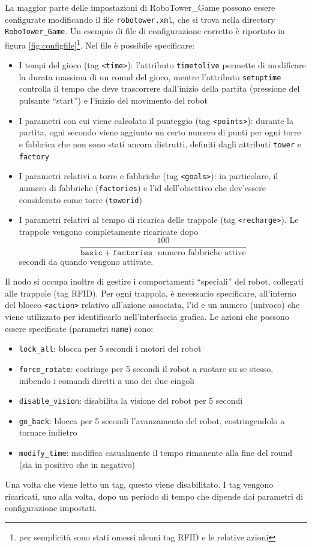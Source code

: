La maggior parte delle impostazioni di RoboTower\_Game possono essere configurate modificando il file \verb|robotower.xml|, che si trova nella directory \verb|RoboTower_Game|. Un esempio di file di configurazione corretto è riportato in figura \ref{fig:configfile}\footnote{per semplicità sono stati omessi alcuni tag RFID e le relative azioni}. Nel file è possibile specificare:
\begin{itemize}
\item I tempi del gioco (tag \lstinline|<time>|): l'attributo \lstinline|timetolive| permette di modificare la durata massima di un round del gioco, mentre l'attributo \lstinline|setuptime| controlla il tempo che deve trascorrere dall'inizio della partita (pressione del pulsante ``start'') e l'inizio del movimento del robot
\item I parametri con cui viene calcolato il punteggio (tag \lstinline|<points>|): durante la partita, ogni secondo viene aggiunto un certo numero di punti per ogni torre e fabbrica che non sono stati ancora distrutti, definiti dagli attributi \lstinline|tower| e \lstinline|factory|
\item I parametri relativi a torre e fabbriche (tag \lstinline|<goals>|): in particolare, il numero di fabbriche (\lstinline|factories|) e l'id dell'obiettivo che dev'essere considerato come torre (\lstinline|towerid|)
\item I parametri relativi al tempo di ricarica delle trappole (tag \lstinline|<recharge>|). Le trappole vengono completamente ricaricate dopo
\[\frac{100}{\texttt{basic} + \texttt{factories} \cdot \textrm{numero fabbriche attive}}\]
secondi da quando vengono attivate.
\end{itemize}
Il nodo si occupa inoltre di gestire i comportamenti ``speciali'' del robot, collegati alle trappole (tag RFID). Per ogni trappola, è necessario specificare, all'interno del blocco \lstinline|<action>| relativo all'azione associata, l'id e un numero (univoco) che viene utilizzato per identificarlo nell'interfaccia grafica. Le azioni che possono essere specificate (parametri \lstinline|name|) sono:
\begin{itemize}
\item \lstinline|lock_all|: blocca per 5 secondi i motori del robot
\item \lstinline|force_rotate|: costringe per 5 secondi il robot a ruotare su se stesso, inibendo i comandi diretti a uno dei due cingoli
\item \lstinline|disable_vision|: disabilita la visione del robot per 5 secondi
\item \lstinline|go_back|: blocca per 5 secondi l'avanzamento del robot, costringendolo a tornare indietro
\item \lstinline|modify_time|: modifica casualmente il tempo rimanente alla fine del round (sia in positivo che in negativo)
\end{itemize}
Una volta che viene letto un tag, questo viene disabilitato. I tag vengono ricaricati, uno alla volta, dopo un periodo di tempo che dipende dai parametri di configurazione impostati.

